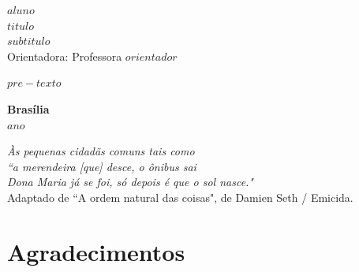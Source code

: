\documentclass[12pt, a4paper, twoside]{article}
\numberwithin{equation}{subsection} %
\newcommand{\titulo}{$titulo$ \\ $subtitulo$}
\newcommand{\autor}{$aluno$}
\newcommand{\orientador}{ Professora $orientador$ }
\newcommand{\coorientador}{ Prof(a). $coorientador$ }
\begin{document}

\thispagestyle{empty}

\begin{center}
\textbf{\autor} \\
\vspace{5cm}
\textbf{\titulo} \\
\vspace{3cm}
\small
Orientadora: \orientador \\
\end{center}


\vspace*{3cm}

\begin{flushright}
\begin{minipage}{7.5cm}
 \parbox[t]{7.5cm}{$pre-texto$}
\end{minipage}
\end{flushright}

\vspace{5cm}

\begin{center}
{\bf{Brasília} \\ }
\bf{$ano$}
\end{center}




\newpage %
\thispagestyle{empty} %


\begin{flushright} %
\textit{Às pequenas cidadãs comuns tais como \\
        ``a merendeira [que] desce, o ônibus sai \\
        Dona Maria já se foi, só depois é que o sol nasce."}\\
\vspace{1cm}        
Adaptado de ``A ordem natural das coisas", de Damien Seth / Emicida.
\end{flushright}


\setcounter{page}{3} 


\newpage %

\doublespacing

\section*{Agradecimentos}
\end{document}
